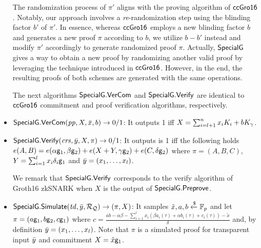 \begin{itemize}
The randomization process of $ \pi' $ aligns with the proving algorithm of $ {\mathsf{ccGro16}} $ \cite{LegoSNARK}. Notably, our approach involves a \emph{re}-randomization step using the blinding factor $ b' $ of $ \pi' $. In essence, whereas $ {\mathsf{ccGro16}} $ employs a new blinding factor $ b $ and generates a new proof $ \pi $ according to $ b $, we utilize $ b-b' $ instead and modify $ \pi' $ accordingly to generate randomized proof $ \pi $. Actually, $ {\mathsf{SpecialG}} $ gives a way to obtain a new proof by randomizing another valid proof by leveraging the technique introduced in $ {\mathsf{ccGro16}} $. However, in the end, the resulting proofs of both schemes are  generated with the same operations. 

The next algorithms $ {\mathsf{SpecialG}}.{\mathsf{VerCom}} $ and $ {\mathsf{SpecialG}}.{\mathsf{Verify}} $ are identical to $ {\mathsf{ccGro16}} $ commitment and proof verification algorithms, respectively.
\item ${\mathsf{SpecialG}}.{\mathsf{VerCom}}(\mathit{pp}, X, \bar{x}, b) \rightarrow 0/1$: It outputs 1 iff
$X = \sum_{i=l+1}^{n} x_i K_i   + b K_{\gamma}$. 
\item ${\mathsf{SpecialG}}.{\mathsf{Verify}}(\mathit{crs}, \bar{y}, X, \pi) \rightarrow 0/1$: It outputs is 1 iff the following holds 
$e(A,B) = e(\alpha\mathsf{g}_1, \beta\mathsf{g}_2) + e(X + Y, \gamma \mathsf{g}_2) + e(C, \delta \mathsf{g}_2)$
where $\pi = (A, B, C)$, $Y = \sum_{i=1}^{l} x_i \delta_i\mathsf{g}_1$ 
and $\bar{y} = (x_1, \ldots, x_l)$. 

We remark that $ {\mathsf{SpecialG}}.{\mathsf{Verify}} $ corresponds to the verify algorithm of Groth16 zkSNARK when $ X $ is the output of $ {\mathsf{SpecialG}}.{\mathsf{Preprove}}$. 

\item${\mathsf{SpecialG}}.{\mathsf{Simulate}}(\mathit{td}, \bar{y}, \mathcal{R}_{\mathcal{Q}}) \rightarrow (\pi, X)$: It samples $\tilde{x}, a, b \xleftarrow {\$} \mathbb{F}_p$ and let $\pi = (a\mathsf{g}_1, b \mathsf{g}_2 , c\mathsf{g}_1)$ where $c = \frac{ab - \alpha \beta - \sum_{i=1}^{l} x_i (\beta a_i(\tau)+ \alpha b_i(\tau)+ c_i(\tau))- \tilde{x}}{\delta}  $ and, 
by definition $\bar{y} = (x_1, \ldots, x_l)$. Note that $\pi$ is a simulated proof for transparent input $\bar{y}$ 
and commitment $X = \tilde{x} \mathsf{g}_1$.
\end{itemize} 



